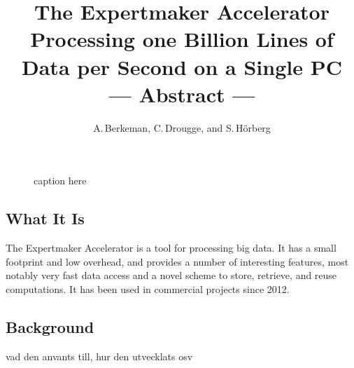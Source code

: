 \documentclass[a4paper]{article}
\title{The Expertmaker Accelerator\\[1ex]\large{Processing one Billion Lines of Data per Second on a
  Single PC}\\\Large{--- Abstract ---}}
\author{A.\,Berkeman, C.\,Drougge, and S.\,H\"orberg}
\date{}
\begin{document}
\maketitle
\thispagestyle{empty}

\begin{figure}[h]
  \begin{center}
    \caption{caption here}
    \label{figure:example}
  \end{center}
\end{figure}







            

\subsection*{What It Is}
The Expertmaker Accelerator is a tool for processing big data.  It has
a small footprint and low overhead, and provides a number of
interesting features, most notably very fast data access and a novel
scheme to store, retrieve, and reuse computations.  It has been used
in commercial projects since 2012.

\subsection*{Background}
vad den anvants till, hur den utvecklats osv
\end{document}
